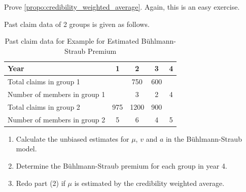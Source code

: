\documentclass[notoc,notitlepage]{tufte-book}
\begin{document}
\begin{ex}
  Prove \cref{propo:credibility_weighted_average}.
  Again, this is an easy exercise.
\end{ex}

\begin{eg}
  Past claim data of 2 groups is given as follows.
  \begin{table}[ht]
    \centering
    \caption{Past claim data for Example for Estimated Bühlmann-Straub Premium}
    \label{table:past_claim_data_for_example_for_estimated_buhlmann_straub_premium}
    \begin{tabular}{l | c c c c}
    Year                         & 1   & 2    & 3   & 4 \\
    \hline
    Total claims in group 1      &     & 750  & 600 & \\
    Number of members in group 1 &     & 3    & 2   & 4 \\
    \hline
    Total claims in group 2      & 975 & 1200 & 900 & \\
    Number of members in group 2 & 5   & 6    & 4   & 5
    \end{tabular}
  \end{table}
  \begin{enumerate}
    \item Calculate the unbiased estimates for $\mu$, $v$ and $a$
      in the Bühlmann-Straub model.
    \item Determine the Bühlmann-Straub premium for each group in year 4.
    \item Redo part (2) if $\mu$ is estimated
      by the credibility weighted average.
  \end{enumerate}
\end{eg}
\end{document}
